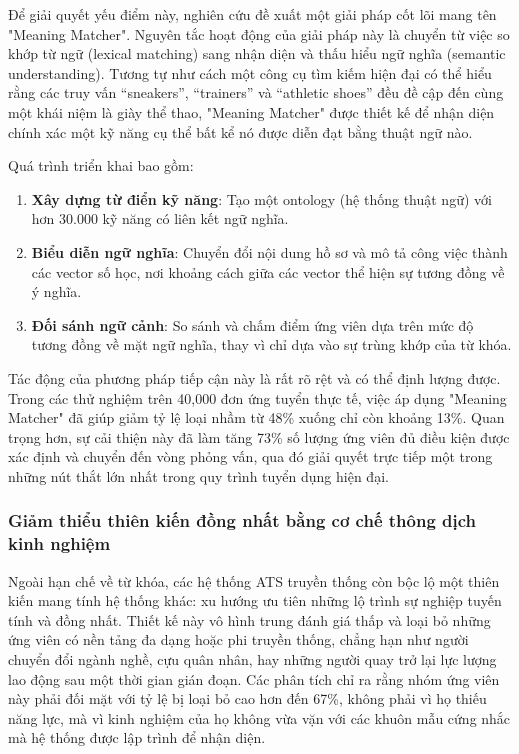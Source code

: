 \documentclass{article}
\begin{document}
Để giải quyết yếu điểm này, nghiên cứu đề xuất một giải pháp cốt lõi mang tên "Meaning Matcher". Nguyên tắc hoạt động của giải pháp này là chuyển từ việc so khớp từ ngữ (lexical matching) sang nhận diện và thấu hiểu ngữ nghĩa (semantic understanding). Tương tự như cách một công cụ tìm kiếm hiện đại có thể hiểu rằng các truy vấn “sneakers”, “trainers” và “athletic shoes” đều đề cập đến cùng một khái niệm là giày thể thao, "Meaning Matcher" được thiết kế để nhận diện chính xác một kỹ năng cụ thể bất kể nó được diễn đạt bằng thuật ngữ nào.

Quá trình triển khai bao gồm:
\begin{enumerate}[topsep=0pt, itemsep=0pt, leftmargin=40pt, label=\arabic*.]
    \item \textbf{Xây dựng từ điển kỹ năng}: Tạo một ontology (hệ thống thuật ngữ) với hơn 30.000 kỹ năng có liên kết ngữ nghĩa.
    \item \textbf{Biểu diễn ngữ nghĩa}: Chuyển đổi nội dung hồ sơ và mô tả công việc thành các vector số học, nơi khoảng cách giữa các vector thể hiện sự tương đồng về ý nghĩa.
    \item \textbf{Đối sánh ngữ cảnh}: So sánh và chấm điểm ứng viên dựa trên mức độ tương đồng về mặt ngữ nghĩa, thay vì chỉ dựa vào sự trùng khớp của từ khóa.
\end{enumerate}

Tác động của phương pháp tiếp cận này là rất rõ rệt và có thể định lượng được. Trong các thử nghiệm trên 40,000 đơn ứng tuyển thực tế, việc áp dụng "Meaning Matcher" đã giúp giảm tỷ lệ loại nhầm từ 48\% xuống chỉ còn khoảng 13\%. Quan trọng hơn, sự cải thiện này đã làm tăng 73\% số lượng ứng viên đủ điều kiện được xác định và chuyển đến vòng phỏng vấn, qua đó giải quyết trực tiếp một trong những nút thắt lớn nhất trong quy trình tuyển dụng hiện đại.

\subsubsection{Giảm thiểu thiên kiến đồng nhất bằng cơ chế thông dịch kinh nghiệm}
Ngoài hạn chế về từ khóa, các hệ thống ATS truyền thống còn bộc lộ một thiên kiến mang tính hệ thống khác: xu hướng ưu tiên những lộ trình sự nghiệp tuyến tính và đồng nhất. Thiết kế này vô hình trung đánh giá thấp và loại bỏ những ứng viên có nền tảng đa dạng hoặc phi truyền thống, chẳng hạn như người chuyển đổi ngành nghề, cựu quân nhân, hay những người quay trở lại lực lượng lao động sau một thời gian gián đoạn. Các phân tích chỉ ra rằng nhóm ứng viên này phải đối mặt với tỷ lệ bị loại bỏ cao hơn đến 67\%, không phải vì họ thiếu năng lực, mà vì kinh nghiệm của họ không vừa vặn với các khuôn mẫu cứng nhắc mà hệ thống được lập trình để nhận diện.
\end{document}
